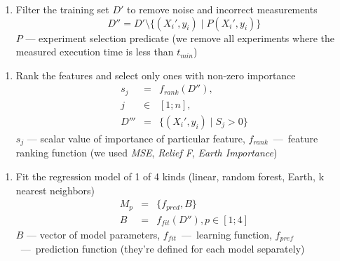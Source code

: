 \documentclass{beamer}
\newcounter{saveenumi}
\newcommand{\seti}{\setcounter{saveenumi}{\value{enumi}}}
\newcommand{\conti}{\setcounter{enumi}{\value{saveenumi}}}
\begin{document}
\begin{frame}
	\begin{enumerate}
		\conti
		\item Filter the training set $D'$ to remove noise and incorrect measurements
			\begin{equation*}
				D'' = D' \setminus \{ (X_i', y_i) \mid P(X_i', y_i) \}
			\end{equation*}
			$P$ --- experiment selection predicate (we remove all experiments where the measured execution time is less than $t_{min}$)
		\seti
	\end{enumerate}
\end{frame}


\begin{frame}
	\begin{enumerate}
		\conti
		\item Rank the features and select only ones with non-zero importance
			\begin{eqnarray}
				s_j &=& f_{rank}(D''), \\
				j &\in & [1;n], \\
				D''' &=& \{ (X_i', y_i) \mid S_j > 0 \}
			\end{eqnarray}
			$s_j$ --- scalar value of importance of particular feature, $f_{rank}$~---~feature ranking function (we used \textit{MSE}, \textit{Relief F}, \textit{Earth Importance})
		\seti
	\end{enumerate}
\end{frame}


\begin{frame}
	\begin{enumerate}
		\conti
		\item Fit the regression model of 1 of 4 kinds (linear, random forest, Earth, k nearest neighbors)
			\begin{eqnarray}
				M_p &=& \{ f_{pred}, B\} \\
				B &=& f_{fit}(D''), p \in [1;4]
			\end{eqnarray}
			$B$ --- vector of model parameters, $f_{fit}$~---~learning function, $f_{pref}$~---~prediction function (they're defined for each model separately)
		\seti
	\end{enumerate}
\end{frame}
\end{document}
